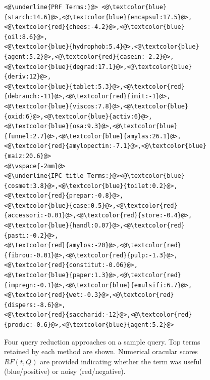 \begin{figure}[t!]
\begin{framed}
\begin{lstlisting}[basicstyle=\scriptsize\ttfamily , linewidth=\columnwidth,breaklines=true]
<@\underline{PRF Terms:}@> <@\textcolor{blue}{starch:14.6}@>,<@\textcolor{blue}{encapsul:17.5}@>,<@\textcolor{red}{chees:-4.2}@>,<@\textcolor{blue}{oil:8.6}@>,
<@\textcolor{blue}{hydrophob:5.4}@>,<@\textcolor{blue}{agent:5.2}@>,<@\textcolor{red}{casein:-2.2}@>,<@\textcolor{blue}{degrad:17.1}@>,<@\textcolor{blue}{deriv:12}@>,
<@\textcolor{blue}{tablet:5.3}@>,<@\textcolor{red}{debranch:-11}@>,<@\textcolor{red}{imit:-1}@>,<@\textcolor{blue}{viscos:7.8}@>,<@\textcolor{blue}{oxid:6}@>,<@\textcolor{blue}{activ:6}@>,
<@\textcolor{blue}{osa:9.3}@>,<@\textcolor{blue}{funnel:2.7}@>,<@\textcolor{blue}{amylas:26.1}@>,<@\textcolor{red}{amylopectin:-7.1}@>,<@\textcolor{blue}{maiz:20.6}@>
<@\vspace{-2mm}@>
<@\underline{IPC title Terms:}@><@\textcolor{blue}{cosmet:3.8}@>,<@\textcolor{blue}{toilet:0.2}@>,<@\textcolor{red}{prepar:-0.8}@>,
<@\textcolor{blue}{case:0.5}@>,<@\textcolor{red}{accessori:-0.01}@>,<@\textcolor{red}{store:-0.4}@>,<@\textcolor{blue}{handl:0.07}@>,<@\textcolor{red}{pasti:-0.2}@>,
<@\textcolor{red}{amylos:-20}@>,<@\textcolor{red}{fibrou:-0.01}@>,<@\textcolor{red}{pulp:-1.3}@>,<@\textcolor{red}{constitut:-0.06}@>,
<@\textcolor{blue}{paper:1.3}@>,<@\textcolor{red}{impregn:-0.1}@>,<@\textcolor{blue}{emulsifi:6.7}@>,<@\textcolor{red}{wet:-0.3}@>,<@\textcolor{red}{dispers:-8.6}@>,
<@\textcolor{red}{saccharid:-12}@>,<@\textcolor{red}{produc:-0.6}@>,<@\textcolor{blue}{agent:5.2}@>
 \end{lstlisting} 
 \vspace*{-4ex}
\end{framed}
 \vspace*{-3.5ex}
  \caption{Four query reduction approaches on a sample query.  Top
    terms retained by each method are shown.  Numerical oracular
    scores $\mathit{RF}(t,Q)$ are provided indicating whether the term
    was useful (blue/positive) or noisy (red/negative).}
  \label{fig:anecdotal}  
\end{figure}

